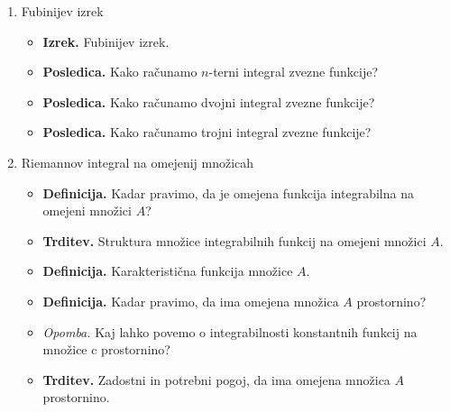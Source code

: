 \begin{enumerate}
    \item Fubinijev izrek
    \begin{itemize}
        \item \colorbox{blue!30}{\textbf{Izrek.}} Fubinijev izrek.
        \item \colorbox{orange!30}{\textbf{Posledica.}} Kako računamo \(n\)-terni integral zvezne funkcije?
        \item \colorbox{orange!30}{\textbf{Posledica.}} Kako računamo dvojni integral zvezne funkcije?
        \item \colorbox{orange!30}{\textbf{Posledica.}} Kako računamo trojni integral zvezne funkcije?
    \end{itemize}

    \item Riemannov integral na omejenij množicah
    \begin{itemize}
        \item \colorbox{purple!30}{\textbf{Definicija.}} Kadar pravimo, da je omejena funkcija integrabilna na omejeni množici \(A\)?
        \item \colorbox{blue!30}{\textbf{Trditev.}} Struktura množice integrabilnih funkcij na omejeni množici \(A\).
        \item \colorbox{purple!30}{\textbf{Definicija.}} Karakteristična funkcija množice \(A\).
        \item \colorbox{purple!30}{\textbf{Definicija.}} Kadar pravimo, da ima omejena množica \(A\) prostornino?
        \item \colorbox{yellow!30}{\emph{Opomba.}} Kaj lahko povemo o integrabilnosti konstantnih funkcij na množice c prostornino?
        \item \colorbox{blue!30}{\textbf{Trditev.}} Zadostni in potrebni pogoj, da ima omejena množica \(A\) prostornino.
    \end{itemize}


\end{enumerate}
